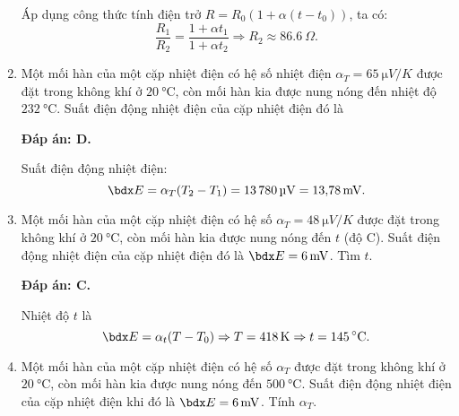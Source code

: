 \begin{enumerate}[label=\bfseries Câu \arabic*:]
{		Áp dụng công thức tính điện trở $R=R_0 (1+ \alpha (t-t_0))$, ta có:
		$$\dfrac{R_1}{R_2} = \dfrac{1 + \alpha t_1}{1 + \alpha t_2} \Rightarrow R_2 \approx \SI{86.6}{\Omega}.$$
	}
	\item {}
	
	\cauhoi
	{Một mối hàn của một cặp nhiệt điện có hệ số nhiệt điện $\alpha_T = \SI{65}{\micro V / K}$ được đặt trong không khí ở $\SI{20}{\celsius}$, còn mối hàn kia được nung nóng đến nhiệt độ $\SI{232}{\celsius}$. Suất điện động nhiệt điện của cặp nhiệt điện đó là
		
	}
	\loigiai
	{	\textbf{Đáp án: D.}
		
		Suất điện động nhiệt điện:
		$$\calE = \alpha_T (T_2 - T_1) = \SI{13780}{\micro V} = \SI{13.78}{mV}.$$
	}
	\item {}
	
	\cauhoi
	{Một mối hàn của một cặp nhiệt điện có hệ số $\alpha_T  = \SI{48}{\micro V / K}$ được đặt trong không khí ở $\SI{20}{\celsius}$, còn mối hàn kia được nung nóng đến $t$ (độ C). Suất điện động nhiệt điện của cặp nhiệt điện đó là $\calE = \SI{6}{mV}$. Tìm $t$.
		
	}
	\loigiai
	{	\textbf{Đáp án: C.}
		
		Nhiệt độ $t$ là
		$$\calE = \alpha_t (T-T_0) \Rightarrow T = \SI{418}{K} \Rightarrow t = \SI{145}{\celsius}.$$
	}
	\item {}
	
	\cauhoi
	{Một mối hàn của một cặp nhiệt điện có hệ số $\alpha_T$ được đặt trong không khí ở $\SI{20}{\celsius}$, còn mối hàn kia được nung nóng đến $\SI{500}{\celsius}$. Suất điện động nhiệt điện của cặp nhiệt điện khi đó là $\calE = \SI{6}{mV}$. Tính $\alpha_T$.
		
}
\end{enumerate}
